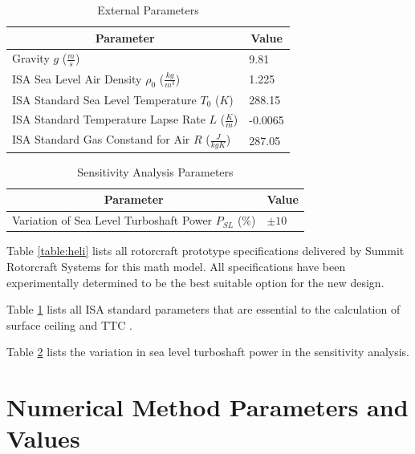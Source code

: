 \documentclass[12pt]{report}
\begin{document}
\begin{table}
\caption{External Parameters}
\label{table:ISA}
\centering
\renewcommand{\arraystretch}{1.25}
\begin{tabular}{l l} %
\hline\hline
\multicolumn{1}{c}{Parameter} &
\multicolumn{1}{c}{Value} \\ %
\hline
Gravity $g$ ($\frac{m}{s}$) & 9.81 \\
ISA Sea Level Air Density $\rho_0$ ($\frac{kg}{m^3}$) & 1.225 \\
ISA Standard Sea Level Temperature $T_0$ ($K$) & 288.15 \\
ISA Standard Temperature Lapse Rate $L$ ($\frac{K}{m}$) & -0.0065 \\
ISA Standard Gas Constand for Air $R$ ($\frac{J}{kgK}$) & 287.05 \\
\hline\hline
\end{tabular}
\normalsize
\end{table}

\begin{table}
\caption{Sensitivity Analysis Parameters}
\label{table:sa}
\centering
\renewcommand{\arraystretch}{1.25}
\begin{tabular}{l l} %
\hline\hline
\multicolumn{1}{c}{Parameter} &
\multicolumn{1}{c}{Value} \\ %
\hline
Variation of Sea Level Turboshaft Power $P_{SL}$ (\%) & $\pm 10$ \\
\hline\hline
\end{tabular}
\normalsize
\end{table}


Table \ref{table:heli} lists all rotorcraft prototype specifications delivered by Summit Rotorcraft Systems for this math model.
All specifications have been experimentally determined to be the best suitable option for the new design.

Table \ref{table:ISA} lists all ISA standard parameters that are essential to the calculation of surface ceiling and TTC \cite{ISA}.

Table \ref{table:sa} lists the variation in sea level turboshaft power in the sensitivity analysis.

\section{Numerical Method Parameters and Values}
\end{document}
